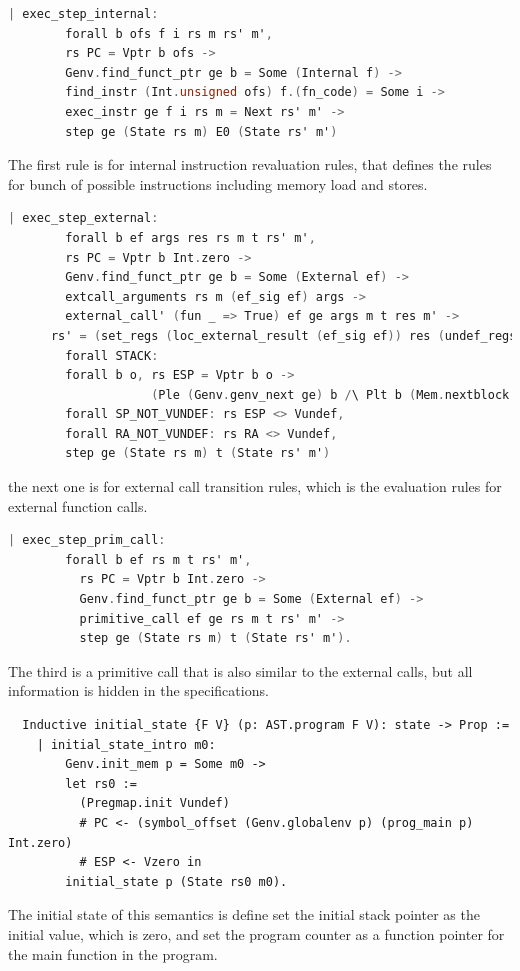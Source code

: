 \begin{lstlisting}[language=C]
    | exec_step_internal:
        forall b ofs f i rs m rs' m',
        rs PC = Vptr b ofs ->
        Genv.find_funct_ptr ge b = Some (Internal f) ->
        find_instr (Int.unsigned ofs) f.(fn_code) = Some i ->
        exec_instr ge f i rs m = Next rs' m' ->
        step ge (State rs m) E0 (State rs' m')
\end{lstlisting}
The first rule is for internal instruction revaluation rules, 
that defines the rules for bunch of possible instructions including 
memory load and stores. 
\begin{lstlisting}[language=C]
    | exec_step_external:
        forall b ef args res rs m t rs' m',
        rs PC = Vptr b Int.zero ->
        Genv.find_funct_ptr ge b = Some (External ef) ->
        extcall_arguments rs m (ef_sig ef) args ->
        external_call' (fun _ => True) ef ge args m t res m' ->
      rs' = (set_regs (loc_external_result (ef_sig ef)) res (undef_regs (CR ZF :: CR CF :: CR PF :: CR SF :: CR OF :: nil) (undef_regs (map preg_of destroyed_at_call) rs))) #PC <- (rs RA) #RA <- Vundef ->
        forall STACK:
        forall b o, rs ESP = Vptr b o ->
                    (Ple (Genv.genv_next ge) b /\ Plt b (Mem.nextblock m)),
        forall SP_NOT_VUNDEF: rs ESP <> Vundef,
        forall RA_NOT_VUNDEF: rs RA <> Vundef,
        step ge (State rs m) t (State rs' m')
\end{lstlisting}
the next one is for external call transition rules, which is
the evaluation rules for external function calls.
\begin{lstlisting}[language=C]
    | exec_step_prim_call:
        forall b ef rs m t rs' m',
          rs PC = Vptr b Int.zero ->
          Genv.find_funct_ptr ge b = Some (External ef) ->
          primitive_call ef ge rs m t rs' m' ->
          step ge (State rs m) t (State rs' m').
\end{lstlisting}
The third is a primitive call that is also similar to the external calls,
but all information is hidden in the specifications. 
\begin{lstlisting}
  Inductive initial_state {F V} (p: AST.program F V): state -> Prop :=
    | initial_state_intro m0:
        Genv.init_mem p = Some m0 ->
        let rs0 :=
          (Pregmap.init Vundef)
          # PC <- (symbol_offset (Genv.globalenv p) (prog_main p) Int.zero)
          # ESP <- Vzero in
        initial_state p (State rs0 m0).
\end{lstlisting}
The initial state of this semantics is define 
set the initial stack pointer as the initial value, which is zero,
and set the program counter as a function pointer for the main function in the program. 

